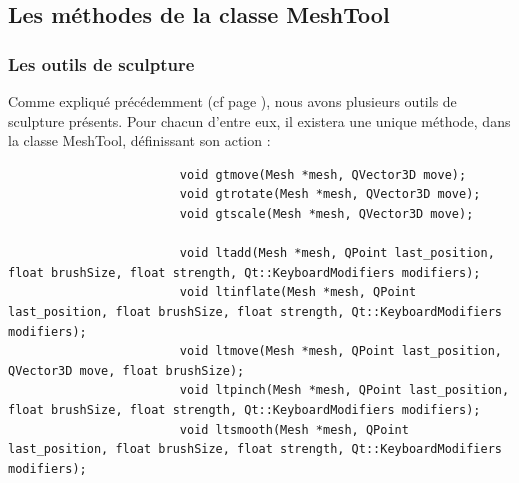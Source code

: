 \documentclass[a4paper]{memoir}
\begin{document}
			\subsection{Les méthodes de la classe MeshTool}
				\label{tool-dev}
				\subsubsection{Les outils de sculpture}
					Comme expliqué précédemment (cf page \pageref{tool-cdc}), nous avons plusieurs outils de sculpture présents. Pour chacun d'entre eux, 
					il existera une unique méthode, dans la classe MeshTool, définissant son action :
					\begin{verbatim}
						void gtmove(Mesh *mesh, QVector3D move);
						void gtrotate(Mesh *mesh, QVector3D move);
						void gtscale(Mesh *mesh, QVector3D move);

						void ltadd(Mesh *mesh, QPoint last_position, float brushSize, float strength, Qt::KeyboardModifiers modifiers);
						void ltinflate(Mesh *mesh, QPoint last_position, float brushSize, float strength, Qt::KeyboardModifiers modifiers);
						void ltmove(Mesh *mesh, QPoint last_position, QVector3D move, float brushSize);
						void ltpinch(Mesh *mesh, QPoint last_position, float brushSize, float strength, Qt::KeyboardModifiers modifiers);
						void ltsmooth(Mesh *mesh, QPoint last_position, float brushSize, float strength, Qt::KeyboardModifiers modifiers);
					\end{verbatim}
\end{document}
